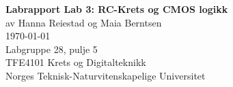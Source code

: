 \documentclass[12pt, a4paper]{article}
\begin{document}
\begin{titlepage}
    \begin{center}
        \vspace*{1.5cm}
        {\Huge\textbf{Labrapport Lab 3: RC-Krets og CMOS logikk}}\\
        \vspace{1cm}
        {\Large av Hanna Reiestad og Maia Berntsen}\\
        \vspace{1cm}
        \today\\ 
        \vspace{1cm}
        Labgruppe 28, pulje 5\\
        
        \vfill
        {
            \large TFE4101 Krets og Digitalteknikk\\ 
            Norges Teknisk-Naturvitenskapelige Universitet
        }
        
        
        
    \end{center}
\end{titlepage}


\clearpage

\clearpage

\tableofcontents
{}
\clearpage
{}
\setcounter{page}{1}

\clearpage

\clearpage

\clearpage

\clearpage

\clearpage

\clearpage

\printbibliography
{}
\clearpage


\end{document}
